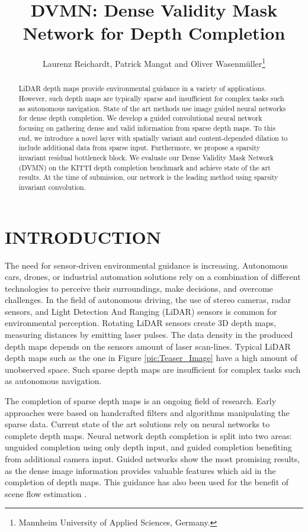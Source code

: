 \documentclass[letterpaper, 10 pt, conference]{ieeeconf}  \usepackage{geometry}
\title{\LARGE \bf 
DVMN: Dense Validity Mask Network for Depth Completion
}
\author{Laurenz Reichardt, Patrick Mangat and Oliver Wasenm\"uller\thanks{Mannheim University of Applied Sciences, Germany.\linebreak{\tt\small l.reichardt@stud.hs-mannheim.de}\linebreak{\tt\small p.mangat@hs-mannheim.de}\linebreak{\tt\small o.wasenmueller@hs-mannheim.de}}}
\begin{document}
	
	
\maketitle
\thispagestyle{empty}
\pagestyle{empty}


\begin{abstract}
LiDAR depth maps provide environmental guidance in a variety of applications. However, such depth maps are typically sparse and insufficient for complex tasks such as autonomous navigation. State of the art methods use image guided neural networks for dense depth completion. We develop a guided convolutional neural network focusing on gathering dense and valid information from sparse depth maps. To this end, we introduce a novel layer with spatially variant and content-depended dilation to include additional data from sparse input. Furthermore, we propose a sparsity invariant residual bottleneck block. We evaluate our Dense Validity Mask Network (DVMN) on the KITTI depth completion benchmark and achieve state of the art results. At the time of submission, our network is the leading method using sparsity invariant convolution.
\end{abstract}

\section{INTRODUCTION}
The need for sensor-driven environmental guidance is increasing. Autonomous cars, drones, or industrial automation solutions rely on a combination of different technologies to perceive their surroundings, make decisions, and overcome challenges. In the field of autonomous driving, the use of stereo cameras, radar sensors, and Light Detection And Ranging (LiDAR) sensors is common for environmental perception. Rotating LiDAR sensors create 3D depth maps, measuring distances by emitting laser pulses. The data density in the produced depth maps depends on the sensors amount of laser scan-lines. Typical LiDAR depth maps such as the one in Figure \ref{pic:Teaser_Image} have a high amount of unobserved space. Such sparse depth maps are insufficient for complex tasks such as autonomous navigation. 

The completion of sparse depth maps is an ongoing field of research. Early approaches were based on handcrafted filters and algorithms manipulating the sparse data. Current state of the art solutions rely on neural networks to complete depth maps. Neural network depth completion is split into two areas: unguided completion using only depth input, and guided completion benefiting from additional camera input. Guided networks show the most promising results, as the dense image information provides valuable features which aid in the completion of depth maps. This guidance has also been used for the benefit of scene flow estimation \cite{SceneFlow}.
\end{document}
